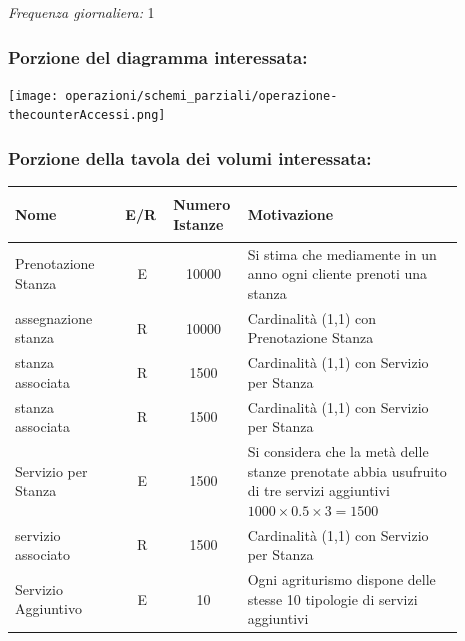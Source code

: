 \documentclass[12pt,a4paper]{article}
\begin{document}
\noindent\textit{Frequenza giornaliera:} 1

\subsubsection*{Porzione del diagramma interessata:}

\texttt{[image: operazioni/schemi\_parziali/operazione-\\thecounterAccessi.png]} 
\subsubsection*{Porzione della tavola dei volumi interessata:}
\begin{center}\setlength{\extrarowheight}{1.5pt}\begin{longtable}{|p{0.23\linewidth}|p{0.1\linewidth}|p{0.11\linewidth}|p{0.45\linewidth}|}
\hline \textbf{Nome}   & \begin{center}\vspace{-15pt}\textbf{E/R}\end{center} & \textbf{Numero Istanze} & \textbf{Motivazione}\\ 
\hline
Prenotazione Stanza
 & 
\multicolumn{1}{|c|}{E}
 & 
\multicolumn{1}{|c|}{10000}
 & 
Si stima che mediamente in un anno ogni cliente prenoti una stanza
\\

\hline
assegnazione stanza
 & 
\multicolumn{1}{|c|}{R}
 & 
\multicolumn{1}{|c|}{10000}
 & 
Cardinalità (1,1) con Prenotazione Stan\-za 
\\

\hline
stanza associata
 & 
\multicolumn{1}{|c|}{R}
 & 
\multicolumn{1}{|c|}{1500}
 & 
Cardinalità (1,1) con Servizio per Stanza
\\

\hline
stanza associata
 & 
\multicolumn{1}{|c|}{R}
 & 
\multicolumn{1}{|c|}{1500}
 & 
Cardinalità (1,1) con Servizio per Stanza
\\

\hline
Servizio per Stanza
 & 
\multicolumn{1}{|c|}{E}
 & 
\multicolumn{1}{|c|}{1500}
 & 
Si considera che la metà delle stanze prenotate abbia usufruito di tre servizi aggiuntivi $1000\times 0.5 \times 3 = 1500$
\\

\hline
servizio associato
 & 
\multicolumn{1}{|c|}{R}
 & 
\multicolumn{1}{|c|}{1500}
 & 
Cardinalità (1,1) con Servizio per Stanza
\\

\hline
Servizio Aggiuntivo
 & 
\multicolumn{1}{|c|}{E}
 & 
\multicolumn{1}{|c|}{10}
 & 
Ogni agriturismo dispone delle stesse 10 tipologie di servizi aggiuntivi
\\


\end{longtable}
\end{center}
\end{document}
